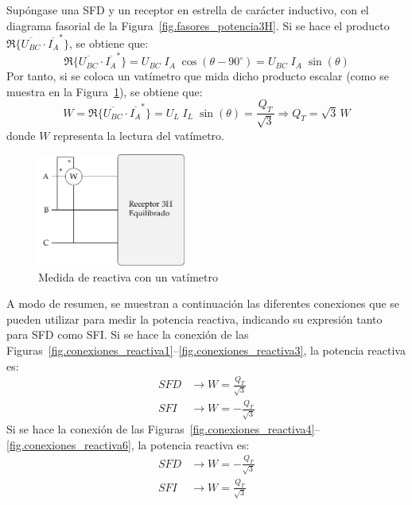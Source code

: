 Supóngase una SFD y un receptor en estrella de carácter inductivo, con el diagrama fasorial de la Figura~\ref{fig.fasores_potencia3H}. Si se hace el producto $\Re\{\overline{U_{BC}} \cdot \overline{I_A}^*\}$, se obtiene que:
\begin{equation*}
    \Re\{\overline{U_{BC}} \cdot \overline{I_A}^*\} = U_{BC}\;I_A\;\cos(\theta-90^\circ)=U_{BC}\;I_A\;\sin(\theta)
\end{equation*}
Por tanto, si se coloca un vatímetro que mida dicho producto escalar (como se muestra en la Figura~\ref{fig.Reactiva3H_A-BC}), se obtiene que: 
\begin{equation}
    W=\Re\{\overline{U_{BC}} \cdot \overline{I_A}^*\}=U_{L}\;I_L\;\sin(\theta)=\dfrac{Q_T}{\sqrt{3}}\Rightarrow \boxed{Q_T=\sqrt{3}\,W}
\end{equation}
donde $W$ representa la lectura del vatímetro. 
\begin{figure}[H]
    \centering
    \includegraphics[height=3.7cm]{../figs/Reactiva3H_A-BC.pdf}
    \caption{Medida de reactiva con un vatímetro}
    \label{fig.Reactiva3H_A-BC}
\end{figure}

A modo de resumen, se muestran a continuación las diferentes conexiones que se pueden utilizar para medir la potencia reactiva, indicando su expresión tanto para SFD como SFI. Si se hace la conexión de las Figuras~\ref{fig.conexiones_reactiva1}--\ref{fig.conexiones_reactiva3}, la potencia reactiva es:
\begin{align}
SFD &\rightarrow \boxed{W = \frac{Q_T}{\sqrt{3}}}\\
SFI &\rightarrow \boxed{W =  - \frac{Q_T}{\sqrt{3}}}
\end{align}
Si se hace la conexión de las Figuras~\ref{fig.conexiones_reactiva4}--\ref{fig.conexiones_reactiva6}, la potencia reactiva es:
\begin{align}
SFD &\rightarrow \boxed{W = - \frac{Q_T}{\sqrt{3}}}\\
SFI &\rightarrow \boxed{W = \frac{Q_T}{\sqrt{3}}}
\end{align}

